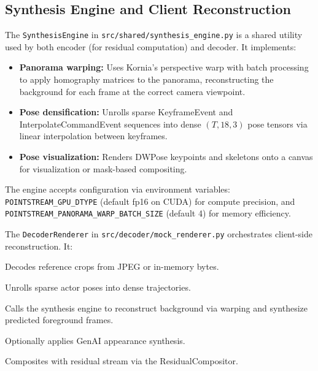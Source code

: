 \documentclass[manuscript, screen]{acmart}
\begin{document}
\subsection{Synthesis Engine and Client Reconstruction}
The \texttt{SynthesisEngine} in \texttt{src/shared/synthesis\_engine.py} is a shared utility used by both encoder (for residual computation) and decoder. It implements:
\begin{itemize}[topsep=0pt,itemsep=0pt,leftmargin=*]
    \item \textbf{Panorama warping:} Uses Kornia's perspective warp with batch processing to apply homography matrices to the panorama, reconstructing the background for each frame at the correct camera viewpoint.
    \item \textbf{Pose densification:} Unrolls sparse KeyframeEvent and InterpolateCommandEvent sequences into dense $(T, 18, 3)$ pose tensors via linear interpolation between keyframes.
    \item \textbf{Pose visualization:} Renders DWPose keypoints and skeletons onto a canvas for visualization or mask-based compositing.
\end{itemize}
The engine accepts configuration via environment variables: \texttt{POINTSTREAM\_GPU\_DTYPE} (default fp16 on CUDA) for compute precision, and \texttt{POINTSTREAM\_PANORAMA\_WARP\_BATCH\_SIZE} (default 4) for memory efficiency.

The \texttt{DecoderRenderer} in \texttt{src/decoder/mock\_renderer.py} orchestrates client-side reconstruction. It:
\begin{enumerate*}[label=\textit{(\roman*)}]
    \item Decodes reference crops from JPEG or in-memory bytes.
    \item Unrolls sparse actor poses into dense trajectories.
    \item Calls the synthesis engine to reconstruct background via warping and synthesize predicted foreground frames.
    \item Optionally applies GenAI appearance synthesis.
    \item Composites with residual stream via the ResidualCompositor.
\end{enumerate*}
\end{document}
